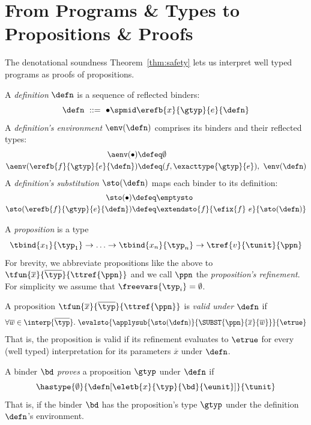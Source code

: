 \section{From Programs \& Types to Propositions \& Proofs}

The denotational soundness Theorem~\ref{thm:safety}
lets us interpret well typed programs as proofs of
propositions.

A \emph{definition} $\defn$ is a sequence of reflected binders:
%
$$\defn \ ::= \ \bullet \spmid \erefb{x}{\gtyp}{e}{\defn}$$
%
A \emph{definition's environment} $\env(\defn)$ comprises
its binders and their reflected types:
%
\begin{align*}
\aenv(\bullet)                    \defeq & \emptyset \\
\aenv(\erefb{f}{\gtyp}{e}{\defn}) \defeq & (f, \exacttype{\gtyp}{e}),\ \env(\defn) \\
\end{align*}
%
A \emph{definition's substitution} $\sto(\defn)$ maps each binder
to its definition:
%
\begin{align*}
\sto(\bullet)                     \defeq & \emptysto \\
\sto(\erefb{f}{\gtyp}{e}{\defn})  \defeq & \extendsto{f}{\efix{f}\ e}{\sto(\defn)}
\end{align*}

%
A \emph{proposition} is a type
%
$$\tbind{x_1}{\typ_1} \rightarrow \ldots
  \rightarrow \tbind{x_n}{\typ_n}
  \rightarrow \tref{v}{\tunit}{\ppn}$$
%
For brevity, we abbreviate propositions like the above to
%
$\tfun{\overline{x}}{\overline{\typ}}{\ttref{\ppn}}$
%
and we call $\ppn$ the \emph{proposition's refinement}.
%
For simplicity we assume that $\freevars{\typ_i} = \emptyset$.

%

A proposition $\tfun{\overline{x}}{\overline{\typ}}{\ttref{\ppn}}$
is \emph{valid under} $\defn$ if
%
$$\forall \overline{w} \in \interp{\overline{\typ}}.\
  \evalsto{\applysub{\sto(\defn)}{\SUBST{\ppn}{\overline{x}}{\overline{w}}}}{\etrue}$$
%
That is, the proposition is valid if its refinement
evaluates to $\etrue$ for every (well typed)
interpretation for its parameters $\overline{x}$
under $\defn$.

%
A binder $\bd$ \emph{proves} a proposition $\gtyp$ under $\defn$ if
$$\hastype{\emptyset}{\defn[\eletb{x}{\typ}{\bd}{\eunit}]}{\tunit}$$
%
That is, if the binder $\bd$ has the proposition's type $\gtyp$
under the definition $\defn$'s environment.


